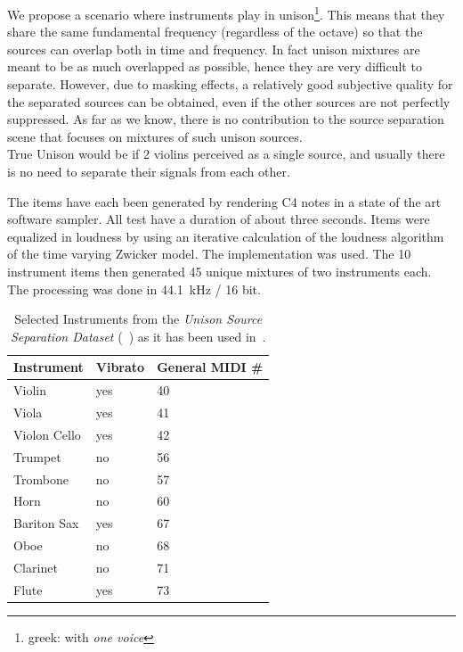 
We propose a scenario where instruments play in unison\footnote{greek: with \emph{one voice}}. 
This means that they share the same fundamental frequency (regardless of the octave) so that the sources can overlap both in time and frequency. In fact unison mixtures are meant to be as much overlapped as possible, hence they are very difficult to separate. However, due to masking effects, a relatively good subjective quality for the separated sources can be obtained, even if the other sources are not perfectly suppressed.
As far as we know, there is no contribution to the source separation scene that focuses on mixtures of such unison sources. \\

True Unison would be if 2 violins perceived as a single source, and usually there is no need to separate their signals from each other.

The items have each been generated by rendering C4 notes in a state of the art software sampler. All test have a duration of about three seconds. Items were equalized in loudness by using an iterative calculation of the loudness algorithm of the time varying Zwicker model. The implementation \cite{genesis12} was used. The 10 instrument items then generated 45 unique mixtures of two instruments each. The processing was done in 44.1~kHz / 16 bit.

\begin{table}
\begin{center}
\footnotesize
\begin{tabular}{ l l l}
  Instrument & Vibrato &  General MIDI \# \\
  \hline
  Violin & yes & 40 \\
  Viola & yes & 41 \\
  Violon Cello & yes & 42 \\
  Trumpet & no & 56 \\
  Trombone & no & 57\\
  Horn & no & 60  \\
  Bariton Sax & yes & 67 \\ %
  Oboe & no & 68\\
  Clarinet & no & 71\\
  Flute & yes & 73\\
\end{tabular}
\end{center}
\caption{Selected Instruments from the \emph{Unison Source Separation Dataset} (~\cite{oss_unison}) as it has been used in~\cite{stoeter14, stoeter16}.}
\label{tab:testset}
\end{table}

